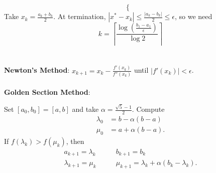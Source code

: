 \documentclass[12pt]{article}
\begin{document}
\begin{multicols}{3}
\begin{equation*}
\begin{cases}
            \end{cases}
        \end{equation*}
        Take $x_k = \frac{a_k + b_k}{2}$. At termination, $\left\lvert x^* - x_k \right\rvert \leq \frac{\left\lvert a_k - b_k \right\rvert}{2} \leq \epsilon$, so we need
        \begin{equation*}
            k = \left\lceil\frac{\log\left(\frac{b_1 - a_1}{\epsilon}\right)}{\log{2}}\right\rceil
        \end{equation*}
        \\\\
        \textbf{Newton's Method}: $x_{k + 1} = x_k - \frac{f'(x_k)}{f''(x_k)}$ until $\left\lvert f'(x_k)\right\rvert < \epsilon$.
        \\\\
        \textbf{Golden Section Method}: 

        Set $[a_0, b_0] = [a, b]$ and take $\alpha = \frac{\sqrt{5} - 1}{2}$. Compute
        \begin{align*}
            \lambda_0 & = b - \alpha(b - a) \\
            \mu_0 & = a + \alpha(b - a).
        \end{align*}
        If $f(\lambda_k) > f(\mu_k)$, then
        \begin{align*}
            a_{k + 1} = \lambda_k &\qquad b_{k + 1} = b_k \\
            \lambda_{k + 1} = \mu_k &\qquad \mu_{k + 1} = \lambda_k + \alpha(b_k - \lambda_k).
        \end{align*}
    \end{multicols}
\end{document}
